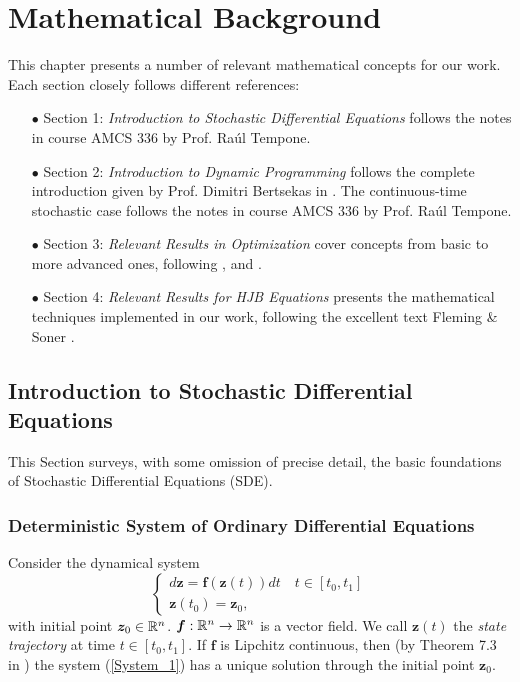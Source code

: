 \chapter{Mathematical Background}

This chapter presents a number of relevant mathematical concepts for our work. Each section closely follows different references:
\begin{enumerate}

\item[$\bullet$] Section 1: \emph{Introduction to Stochastic Differential Equations}  follows the notes in course AMCS 336 \cite{carlsson2010stochastic} by Prof. Ra\'ul Tempone.

\item[$\bullet$] Section 2: \emph{Introduction to Dynamic Programming} follows the
complete introduction given by Prof. Dimitri Bertsekas in \cite{bertsekas1995dynamic}.
The continuous-time stochastic case follows the notes in course AMCS 336
\cite{carlsson2010stochastic} by Prof. Ra\'ul Tempone.

\item[$\bullet$] Section 3: \emph{Relevant Results in Optimization} cover concepts
from basic to more advanced ones, following \cite{bertsekas2003convex},
\cite{bazaraa2013nonlinear} and \cite{nocedal2006numerical}.

\item[$\bullet$] Section 4: \emph{Relevant Results for HJB Equations} presents the mathematical techniques implemented in our work, following the excellent text
    Fleming \& Soner \cite{fleming2006controlled}.

\end{enumerate}

\section{Introduction to Stochastic Differential Equations}

This Section surveys, with some omission of precise detail,
the basic foundations of Stochastic Differential Equations (SDE).

\subsection{Deterministic System of Ordinary Differential Equations} \label{Section_SDE}

Consider the dynamical system
\begin{equation}
\begin{cases}
d\bm{z}=\bm{f}(\bm{z}(t))dt\quad t\in[t_0,t_1]\\
\bm{z}(t_0)=\bm{z}_0,
\end{cases}
\label{System_1}
\end{equation}
with initial point $\bm{z}_0\in\mathbb{R}^n$. $\bm{f}:\mathbb{R}^n\to\mathbb{R}^n$ is a vector field. We call $\bm{z}(t)$ the \textit{state trajectory} at time $t\in[t_0,t_1]$. If
$\bm{f}$ is Lipchitz continuous, then (by Theorem 7.3 in \cite{brezis2010functional})
the system (\ref{System_1}) has a unique solution through the initial point $\bm{z}_0$.\\

